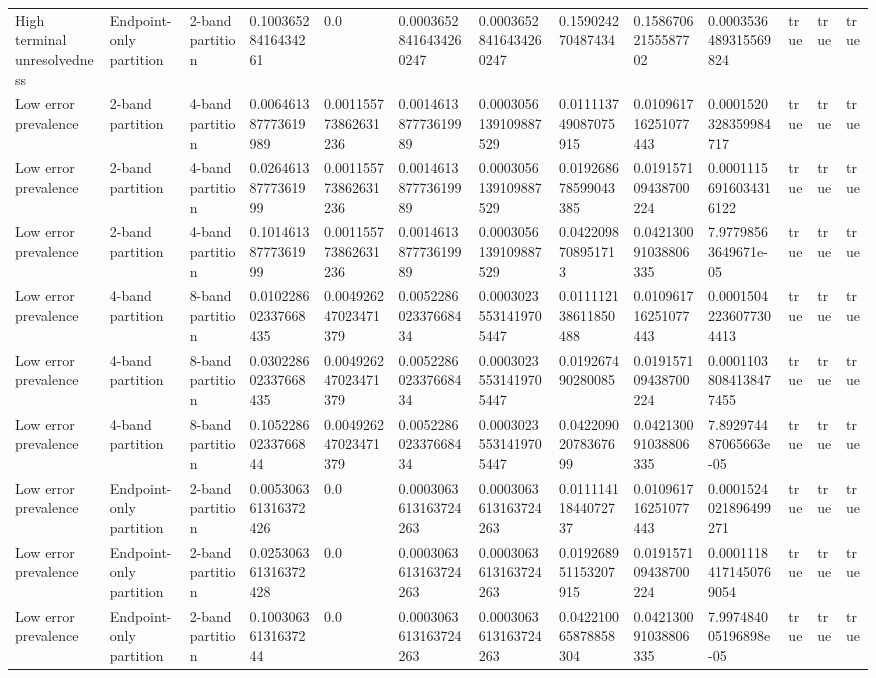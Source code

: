 \begin{tabular}{lllllllllllll}
High terminal unresolvedness & Endpoint-only partition & 2-band partition & 0.10036528416434261 & 0.0 & 0.00036528416434260247 & 0.00036528416434260247 & 0.159024270487434 & 0.15867062155587702 & 0.0003536489315569824 & true & true & true \\
Low error prevalence & 2-band partition & 4-band partition & 0.006461387773619989 & 0.001155773862631236 & 0.001461387773619989 & 0.0003056139109887529 & 0.011113749087075915 & 0.010961716251077443 & 0.0001520328359984717 & true & true & true \\
Low error prevalence & 2-band partition & 4-band partition & 0.02646138777361999 & 0.001155773862631236 & 0.001461387773619989 & 0.0003056139109887529 & 0.019268678599043385 & 0.019157109438700224 & 0.00011156916034316122 & true & true & true \\
Low error prevalence & 2-band partition & 4-band partition & 0.10146138777361999 & 0.001155773862631236 & 0.001461387773619989 & 0.0003056139109887529 & 0.0422098708951713 & 0.042130091038806335 & 7.97798563649671e-05 & true & true & true \\
Low error prevalence & 4-band partition & 8-band partition & 0.010228602337668435 & 0.004926247023471379 & 0.005228602337668434 & 0.00030235531419705447 & 0.011112138611850488 & 0.010961716251077443 & 0.00015042236077304413 & true & true & true \\
Low error prevalence & 4-band partition & 8-band partition & 0.030228602337668435 & 0.004926247023471379 & 0.005228602337668434 & 0.00030235531419705447 & 0.019267490280085 & 0.019157109438700224 & 0.00011038084138477455 & true & true & true \\
Low error prevalence & 4-band partition & 8-band partition & 0.10522860233766844 & 0.004926247023471379 & 0.005228602337668434 & 0.00030235531419705447 & 0.04220902078367699 & 0.042130091038806335 & 7.892974487065663e-05 & true & true & true \\
Low error prevalence & Endpoint-only partition & 2-band partition & 0.005306361316372426 & 0.0 & 0.0003063613163724263 & 0.0003063613163724263 & 0.01111411844072737 & 0.010961716251077443 & 0.0001524021896499271 & true & true & true \\
Low error prevalence & Endpoint-only partition & 2-band partition & 0.025306361316372428 & 0.0 & 0.0003063613163724263 & 0.0003063613163724263 & 0.019268951153207915 & 0.019157109438700224 & 0.00011184171450769054 & true & true & true \\
Low error prevalence & Endpoint-only partition & 2-band partition & 0.10030636131637244 & 0.0 & 0.0003063613163724263 & 0.0003063613163724263 & 0.042210065878858304 & 0.042130091038806335 & 7.997484005196898e-05 & true & true & true \\

\end{tabular}
